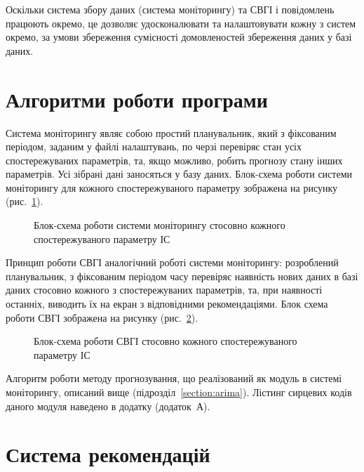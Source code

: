 \documentclass{thesis_utf8}
\begin{document}
Оскільки система збору даних (система моніторингу) та СВГІ і повідомлень працюють окремо, це дозволяє удосконалювати та налаштовувати кожну з систем окремо, за умови збереження сумісності домовленостей збереження даних у базі даних.

\section{Алгоритми роботи програми}

Система моніторингу являє собою простий планувальник, який з фіксованим періодом, заданим у файлі налаштувань, по черзі перевіряє стан усіх спостережуваних параметрів, та, якщо можливо, робить прогнозу стану інших параметрів. Усі зібрані дані заносяться у базу даних. Блок-схема роботи системи моніторингу для кожного спостережуваного параметру зображена на рисунку (рис.~\ref{fig:block_scheme_monitor}).

\begin{figure}[!h]
    \centering
    \caption{Блок-схема роботи системи моніторингу стосовно кожного спостережуваного параметру ІС}
    \label{fig:block_scheme_monitor}
\end{figure}

Принцип роботи СВГІ аналогічний роботі системи моніторингу: розроблений планувальник, з фіксованим періодом часу перевіряє наявність нових даних в базі даних стосовно кожного з спостережуваних параметрів, та, при наявності останніх, виводить їх на екран з відповідними рекомендаціями. Блок схема роботи СВГІ зображена на рисунку (рис.~\ref{fig:block_scheme_info}).

\begin{figure}[!h]
    \centering
    \caption{Блок-схема роботи СВГІ стосовно кожного спостережуваного параметру ІС}
    \label{fig:block_scheme_info}
\end{figure}

Алгоритм роботи методу прогнозування, що реалізований як модуль в системі моніторингу, описаний вище (підрозділ~\ref{section:arima}). Лістинг сирцевих кодів даного модуля наведено в додатку (додаток~А).

\section{Система рекомендацій}
\end{document}
